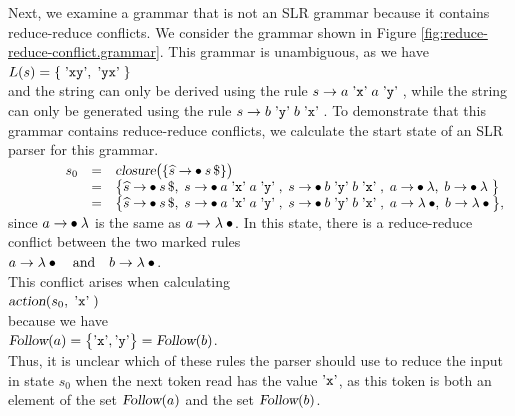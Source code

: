Next, we examine a grammar that is not an SLR grammar because it contains reduce-reduce conflicts. 
We consider the grammar shown in Figure \ref{fig:reduce-reduce-conflict.grammar}. This grammar is unambiguous, as we have
\\[0.2cm]
\hspace*{1.3cm}
$L(s) = \{\; \mbox{'\texttt{xy}'}, \;\mbox{'\texttt{yx}'} \;\}$
\\[0.2cm]
and the string  can only be derived using the rule $s \rightarrow  a \;\mbox{'\texttt{x}'}\; a \;\mbox{'\texttt{y}'}\;$, while the string  can only be generated using the rule 
$s \rightarrow b \;\mbox{'\texttt{y}'}\; b \;\mbox{'\texttt{x}'}\;$.
To demonstrate that this grammar contains reduce-reduce conflicts, we calculate the start state of an SLR parser for this grammar.
\\[0.2cm]
$\hspace*{1.3cm}
\begin{array}[t]{lcl}
 s_0 & = & \textsl{closure}\bigl( \{ \widehat{s} \rightarrow \mdot s\,\symbol{36} \}\bigr) \\
     & = & \bigl\{ \widehat{s} \rightarrow \mdot s\,\symbol{36},\;
                   s \rightarrow \mdot a \aquoted{x} a \aquoted{y},\;
                   s \rightarrow \mdot b \aquoted{y} b \aquoted{x},\;
                   a \rightarrow \mdot \lambda, \;
                   b \rightarrow \mdot \lambda \;
            \bigr\} \\
     & = & \bigl\{ \widehat{s} \rightarrow \mdot s\,\symbol{36},\;
                   s \rightarrow \mdot a \aquoted{x} a \aquoted{y},\;
                   s \rightarrow \mdot b \aquoted{y} b \aquoted{x},\;
                   a \rightarrow \lambda \mdot, \;
                   b \rightarrow \lambda \mdot
            \bigr\},
 \end{array}
$
\\[0.2cm] 
since $a \rightarrow \mdot \lambda$ is the same as $a \rightarrow \lambda \mdot$.
In this state, there is a reduce-reduce conflict between the two marked rules
\\[0.2cm]
\hspace*{1.3cm}
$a \rightarrow \lambda \mdot \quad \mbox{and} \quad b \rightarrow \lambda\mdot$.
\\[0.2cm]
This conflict arises when calculating 
\\[0.2cm]
\hspace*{1.3cm}
$\textsl{action}(s_0, \;\mbox{'\texttt{x}'}\;)$
\\[0.2cm]
because we have 
\\[0.2cm]
\hspace*{1.3cm}
$\textsl{Follow}(a) = \bigl\{ \mbox{'\texttt{x}'}, \mbox{'\texttt{y}'} \bigr\} = \textsl{Follow}(b)$.
\\[0.2cm]
Thus, it is unclear which of these rules the parser should use to reduce the input in state $s_0$ when the next token read has the value $\mbox{'\texttt{x}'}$, as this token is
both an element of the set $\textsl{Follow}(a)$ and the set $\textsl{Follow}(b)$.

